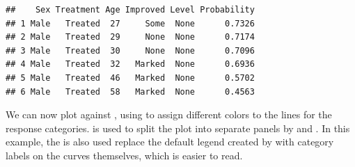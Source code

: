 \documentclass[11pt]{book}
\renewenvironment{knitrout}{\small\renewcommand{\baselinestretch}{.85}}{} %
\begin{document}
\begin{knitrout}
\color{fgcolor}\begin{kframe}
\begin{alltt}
 \hlkwb{<-} 
                 \hlstd{=} \hlstd{(}\hlstd{,} \hlstd{,} \hlstd{,} \hlstd{),}
                \hlstd{=}\hlstd{(}\hlstd{,} \hlstd{,} \hlstd{),}
                 \hlstd{=} \hlstd{,}
                 \hlstd{=} \hlstd{)}
\end{alltt}
\begin{verbatim}
##    Sex Treatment Age Improved Level Probability
## 1 Male   Treated  27     Some  None      0.7326
## 2 Male   Treated  29     None  None      0.7174
## 3 Male   Treated  30     None  None      0.7096
## 4 Male   Treated  32   Marked  None      0.6936
## 5 Male   Treated  46   Marked  None      0.5702
## 6 Male   Treated  58   Marked  None      0.4563
\end{verbatim}
\end{kframe}
\end{knitrout}
We can now plot  against , using  to assign
different colors to the lines for the response categories.  
is used to split the plot into separate panels by  and .
In this example, the  is also used replace the default
legend created by  with category labels on the curves themselves,
which is easier to read.
\end{document}
